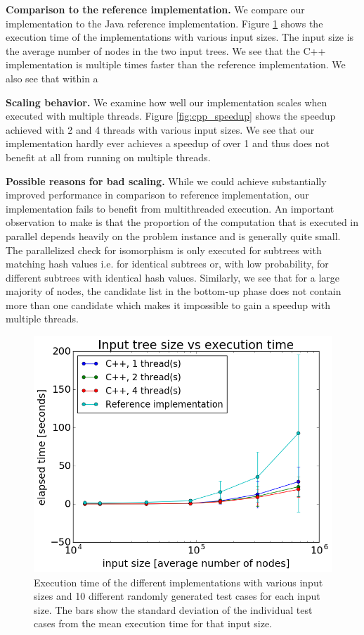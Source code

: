 \documentclass[letterpaper]{article}
\newcommand{\mypar}[1]{{\bf #1.}}
\begin{document}
\mypar{Comparison to the reference implementation}
We compare our implementation to the Java reference implementation.
Figure \ref{fig:cpp_vs_java} shows the execution time of the implementations with various input sizes.
The input size is the average number of nodes in the two input trees.
We see that the C++ implementation is multiple times faster than the reference implementation.
We also see that within a 

\mypar{Scaling behavior}
We examine how well our implementation scales when executed with multiple threads.
Figure \ref{fig:cpp_speedup} shows the speedup achieved with 2 and 4 threads with various input sizes.
We see that our implementation hardly ever achieves a speedup of over 1 and thus does not benefit at all from running on multiple threads.

\mypar{Possible reasons for bad scaling}
While we could achieve substantially improved performance in comparison to reference implementation, our implementation fails to benefit from multithreaded execution.
An important observation to make is that the proportion of the computation that is executed in parallel depends heavily on the problem instance and is generally quite small.
The parallelized check for isomorphism is only executed for subtrees with matching hash values i.e. for identical subtrees or, with low probability, for different subtrees with identical hash values.
Similarly, we see that for a large majority of nodes, the candidate list in the bottom-up phase does not contain more than one candidate which makes it impossible to gain a speedup with multiple threads.

\begin{figure}
	\includegraphics[width=\linewidth]{timePlot}
	\caption{Execution time of the different implementations with various input sizes and 10 different randomly generated test cases for each input size. The bars show the standard deviation of the individual test cases from the mean execution time for that input size.}
	\label{fig:cpp_vs_java}
\end{figure}
\end{document}
